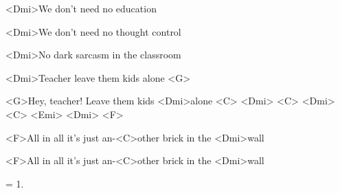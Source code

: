 

\zs
<Dmi>We don’t need no education

<Dmi>We don’t need no thought control

<Dmi>No dark sarcasm in the classroom

<Dmi>Teacher leave them kids alone <G>
\ks

\zr
<G>Hey, teacher! Leave them kids <Dmi>alone <C> <Dmi> <C> <Dmi> <C> <Emi> <Dmi> <F>

<F>All in all it's just an-<C>other brick in the <Dmi>wall

<F>All in all it's just an-<C>other brick in the <Dmi>wall
\kr

\zs
= 1.
\ks

\zr
\kr

\kp
